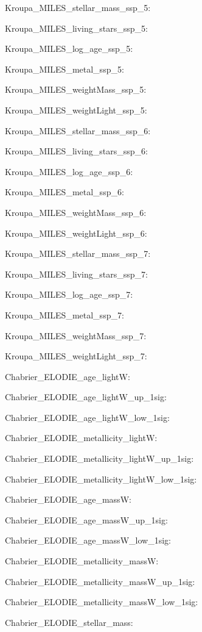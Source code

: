 \item Kroupa\_MILES\_stellar\_mass\_ssp\_5: 
\item Kroupa\_MILES\_living\_stars\_ssp\_5: 
\item Kroupa\_MILES\_log\_age\_ssp\_5: 
\item Kroupa\_MILES\_metal\_ssp\_5: 
\item Kroupa\_MILES\_weightMass\_ssp\_5: 
\item Kroupa\_MILES\_weightLight\_ssp\_5: 
\item Kroupa\_MILES\_stellar\_mass\_ssp\_6: 
\item Kroupa\_MILES\_living\_stars\_ssp\_6: 
\item Kroupa\_MILES\_log\_age\_ssp\_6: 
\item Kroupa\_MILES\_metal\_ssp\_6: 
\item Kroupa\_MILES\_weightMass\_ssp\_6: 
\item Kroupa\_MILES\_weightLight\_ssp\_6: 
\item Kroupa\_MILES\_stellar\_mass\_ssp\_7: 
\item Kroupa\_MILES\_living\_stars\_ssp\_7: 
\item Kroupa\_MILES\_log\_age\_ssp\_7: 
\item Kroupa\_MILES\_metal\_ssp\_7: 
\item Kroupa\_MILES\_weightMass\_ssp\_7: 
\item Kroupa\_MILES\_weightLight\_ssp\_7: 
\item Chabrier\_ELODIE\_age\_lightW: 
\item Chabrier\_ELODIE\_age\_lightW\_up\_1sig: 
\item Chabrier\_ELODIE\_age\_lightW\_low\_1sig: 
\item Chabrier\_ELODIE\_metallicity\_lightW: 
\item Chabrier\_ELODIE\_metallicity\_lightW\_up\_1sig: 
\item Chabrier\_ELODIE\_metallicity\_lightW\_low\_1sig: 
\item Chabrier\_ELODIE\_age\_massW: 
\item Chabrier\_ELODIE\_age\_massW\_up\_1sig: 
\item Chabrier\_ELODIE\_age\_massW\_low\_1sig: 
\item Chabrier\_ELODIE\_metallicity\_massW: 
\item Chabrier\_ELODIE\_metallicity\_massW\_up\_1sig: 
\item Chabrier\_ELODIE\_metallicity\_massW\_low\_1sig: 
\item Chabrier\_ELODIE\_stellar\_mass: 
